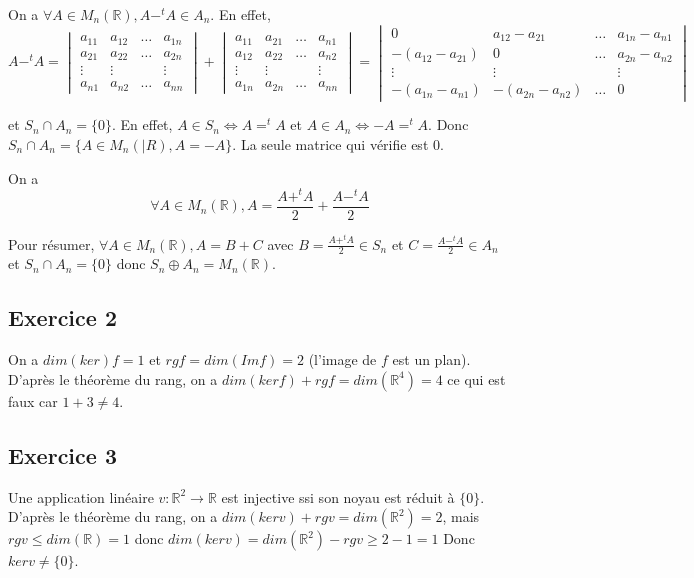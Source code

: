 \documentclass[]{book}
\theoremstyle{definition}
\newcommand{\bb}[1]{\mathbb{#1}}
\newcommand{\R}{\bb{R}}
\begin{document}
On a $\forall A \in M_n(\R), A-^{t}A \in A_n$. En effet,
$$
A - ^{t}A = 
\begin{vmatrix} a_{11} & a_{12} & \ldots & a_{1n} \\ a_{21} & a_{22} & \ldots & a_{2n} \\ \vdots & \vdots & & \vdots \\ a_{n1} & a_{n2} & \ldots & a_{nn} \end{vmatrix} +
\begin{vmatrix} a_{11} & a_{21} & \ldots & a_{n1} \\ a_{12} & a_{22} & \ldots & a_{n2} \\ \vdots & \vdots & & \vdots \\ a_{1n} & a_{2n} & \ldots & a_{nn} \end{vmatrix} =
\begin{vmatrix} 0 & a_{12} - a_{21} & \ldots & a_{1n} - a_{n1} \\ -(a_{12} - a_{21}) & 0 & \ldots & a_{2n} - a_{n2} \\ \vdots & \vdots & & \vdots \\ -(a_{1n} - a_{n1}) & -(a_{2n} - a_{n2})& \ldots & 0 \end{vmatrix}
$$

et $S_n \cap A_n = \{0\}$. En effet, $A \in S_n \Leftrightarrow A = ^{t}A$ et $A \in A_n \Leftrightarrow -A = ^{t}A$. Donc $S_n \cap A_n = \{A \in M_n(|R), A=-A\}$. La seule matrice qui v\'erifie est $0$.

On a 
$$
\forall A \in M_n(\R), A = \frac{A+^{t}A}{2} + \frac{A-^{t}A}{2}
$$

Pour r\'esumer, $\forall A \in M_n(\R), A = B + C$ avec $B=\frac{A+^{t}A}{2} \in S_n$ et $C=\frac{A-^{t}A}{2} \in A_n$ et $S_n \cap A_n = \{0\}$ donc $S_n \oplus A_n = M_n(\R)$.


\subsection*{Exercice 2}
On a $dim (ker) f = 1$ et $rg f = dim (Im f) = 2$ (l'image de $f$ est un plan). D'apr\`es le th\'eor\`eme du rang, on a $dim(ker f) + rg f = dim(\R^4) = 4$ ce qui est faux car $1+3 \neq 4$.

\subsection*{Exercice 3}

Une application lin\'eaire $v:\R^2 \to \R$ est injective ssi son noyau est r\'eduit \`a $\{0\}$. D'apr\`es le th\'eor\`eme du rang, on a $dim(ker v) + rg v = dim(\R^2) = 2$, mais $rg v \leq dim(\R) = 1$ donc $dim(ker v) = dim(\R^2) - rg v \geq  2 - 1 = 1$ Donc $ker v \neq \{0\}$.
\end{document}
